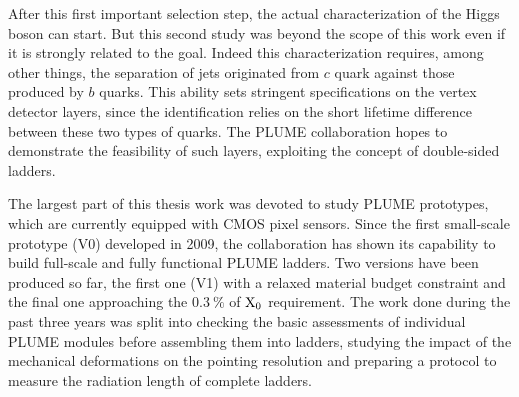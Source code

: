 After this first important selection step, the actual characterization of the Higgs boson can start. 
But this second study was beyond the scope of this work even if it is strongly related to the goal. 
Indeed this characterization requires, among other things, the separation of jets originated from $c$ quark against those produced by $b$ quarks. 
This ability sets stringent specifications on the vertex detector layers, since the identification relies on the short lifetime difference between these two types of quarks. 
The \gls{PLUME} collaboration hopes to demonstrate the feasibility of such layers, exploiting the concept of double-sided ladders.



The largest part of this thesis work was devoted to study \gls{PLUME} prototypes, which are currently equipped with \gls{CMOS} pixel sensors.
Since the first small-scale prototype (V0) developed in 2009, the collaboration has shown its capability to build full-scale and fully functional \gls{PLUME} ladders.
Two versions have been produced so far, the first one (V1) with a relaxed material budget constraint and the final one approaching the $0.3~\%$ of $\rm{X_{0}}$ requirement.
The work done during the past three years was split into checking the basic assessments of individual \gls{PLUME} modules before assembling them into ladders, studying the impact of the mechanical deformations on the pointing resolution and preparing a protocol to measure the radiation length of complete ladders.

